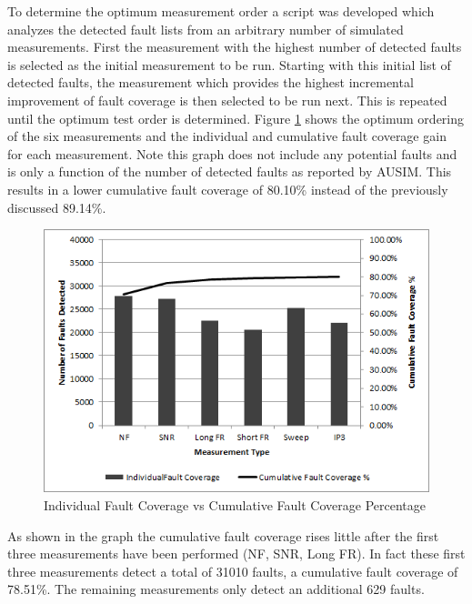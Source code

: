 \documentclass[12pt]{report}
\begin{document}
To determine the optimum measurement order a script was developed which analyzes the detected fault lists from an arbitrary number of simulated measurements.  First the measurement with the highest number of detected faults is selected as the initial measurement to be run.  Starting with this initial list of detected faults, the measurement which provides the highest incremental improvement of fault coverage is then selected to be run next.  This is repeated until the optimum test order is determined.  Figure \ref{fig:cumulativefault} shows the optimum ordering of the six measurements and the individual and cumulative fault coverage gain for each measurement.  Note this graph does not include any potential faults and is only a function of the number of detected faults as reported by AUSIM.  This results in a lower cumulative fault coverage of 80.10\% instead of the previously discussed 89.14\%.
\begin{figure}
  \begin{center}
		\includegraphics[scale=.9]{images/faultcvg-graph}
    \caption{Individual Fault Coverage vs Cumulative Fault Coverage Percentage}
  \label{fig:cumulativefault}
  \end{center}
\end{figure}
As shown in the graph the cumulative fault coverage rises little after the first three measurements have been performed (NF, SNR, Long FR).  In fact these first three measurements detect a total of 31010 faults, a cumulative fault coverage of 78.51\%.  The remaining measurements only detect an additional 629 faults. 
\end{document}
